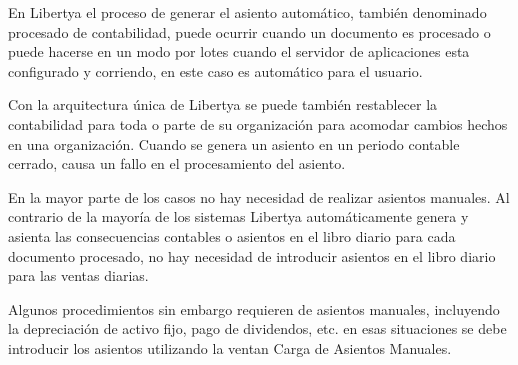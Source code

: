 \documentclass[letterpaper,10pt,spanish]{sphinxmanual}
\begin{document}
En Libertya el proceso de generar el asiento automático, también denominado procesado de contabilidad, puede ocurrir cuando un documento es procesado o puede hacerse en un modo por lotes cuando el servidor de aplicaciones esta configurado y corriendo, en este caso es automático para el usuario.

Con la arquitectura única de Libertya se puede también restablecer la contabilidad para toda o parte de su organización para acomodar cambios hechos en una organización. Cuando se genera un asiento en un periodo contable cerrado, causa un fallo en el procesamiento del asiento.

En la mayor parte de los casos no hay necesidad de realizar asientos manuales. Al contrario de la mayoría de los sistemas Libertya automáticamente genera y asienta las consecuencias contables o asientos en el libro diario para cada documento procesado, no hay necesidad de introducir asientos en el libro diario para las ventas diarias.

Algunos procedimientos sin embargo requieren de asientos manuales, incluyendo la depreciación de activo fijo, pago de dividendos, etc. en esas situaciones se debe introducir los asientos utilizando la ventan Carga de Asientos Manuales.
\end{document}
